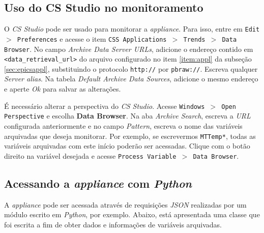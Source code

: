 \subsection{Uso do CS Studio no monitoramento} \label{appliance-csstudio}

O \textit{CS Studio} pode ser usado para monitorar a \textit{appliance}. Para
isso, entre em \texttt{Edit \(>\) Preferences} e acesse o item \texttt{CSS
Applications \(>\) Trends \(>\) Data Browser}. No campo \textit{Archive Data
Server URLs}, adicione o endereço contido em \texttt{<data\_retrieval\_url>} do
arquivo configurado no item \ref{item:appl} da subseção \ref{sec:epicsappl},
substituindo o protocolo \texttt{http://} por \texttt{pbraw://}. Escreva
qualquer \textit{Server alias}. Na tabela \textit{Default Archive Data Sources},
adicione o mesmo endereço e aperte \textit{Ok} para salvar as alterações.

\vspace{12pt}

É necessário alterar a perspectiva do \textit{CS Studio}. Acesse
\texttt{Windows \(>\) Open Perspective} e escolha \textbf{Data Browser}. Na aba
\textit{Archive Search}, escreva a \textit{URL} configurada anteriormente e no
campo \textit{Pattern}, escreva o nome das variáveis arquivadas que deseja
monitorar. Por exemplo, se escrevermos \texttt{MTTemp*}, todas as variáveis
arquivadas com este início poderão ser acessadas. Clique com o botão direito na
variável desejada e acesse \texttt{Process Variable \(>\) Data Browser}.

\subsection{Acessando a \textit{appliance} com \textit{Python}}

A \textit{appliance} pode ser acessada através de requisições \textit{JSON}
realizadas por um módulo escrito em \textit{Python}, por exemplo. Abaixo, está
apresentada uma classe que foi escrita a fim de obter dados e informações de
variáveis arquivadas.

\vspace{12pt}

